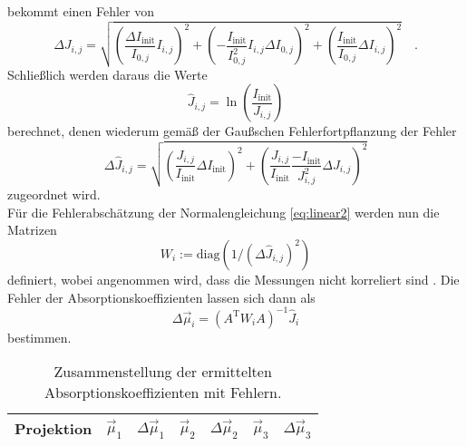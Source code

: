 bekommt einen Fehler von
\begin{equation}
\Delta J_{i,j}= \sqrt{\left(\frac{\Delta I_\text{init}}{I_{0,j}} I_{i,j} \right)^2 +
				\left(- \frac{I_\text{init}}{I_{0,j}^2} I_{i,j} \Delta I_{0,j} \right)^2 +
				\left(\frac{I_\text{init}}{I_{0,j}}\Delta I_{i,j}\right)^2 } \quad.
\end{equation}
Schließlich werden daraus die Werte
\begin{equation}
\hat{J}_{i,j}=\ln\left( \frac{I_\text{init}}{J_{i,j}}  \right)
\end{equation}
berechnet, denen wiederum gemäß der Gaußschen Fehlerfortpflanzung der Fehler
\begin{equation}
\Delta \hat{J}_{i,j}=\sqrt{
\left(\frac{J_{i,j}}{I_\text{init}} \Delta I_\text{init}\right)^2 +
\left(\frac{J_{i,j}}{I_\text{init}} \frac{-I_\text{init}}{J^2_{i,j}} \Delta J_{i,j}\right)^2
}
\end{equation}
zugeordnet wird. \\
Für die Fehlerabschätzung der Normalengleichung \ref{eq:linear2} werden nun die Matrizen 
\begin{equation}
W_i:=\text{diag} (1/ (\Delta\hat{J}_{i,j})^2)
\end{equation}
definiert, wobei angenommen wird, dass die Messungen nicht korreliert sind \cite{Blobel}. 
Die Fehler der Absorptionskoeffizienten lassen sich dann als
\begin{equation}
\Delta \vec{\mu}_i=(A^\text{T}W_i A)^{-1}\hat{J}_i
\end{equation}
bestimmen.

\begin{table}
\centering
\begin{tabular}{c|cc|cc|cc}
\toprule \midrule
Projektion & $\vec{\mu}_1$ & $\Delta \vec{\mu}_1$& $\vec{\mu}_2$ & $\Delta \vec{\mu}_2$& $\vec{\mu}_3$ & $\Delta \vec{\mu}_3$ \\
\midrule

\midrule
\bottomrule
\end{tabular}
\caption{Zusammenstellung der ermittelten Absorptionskoeffizienten mit Fehlern.}
\label{Ergebnis}
\end{table}